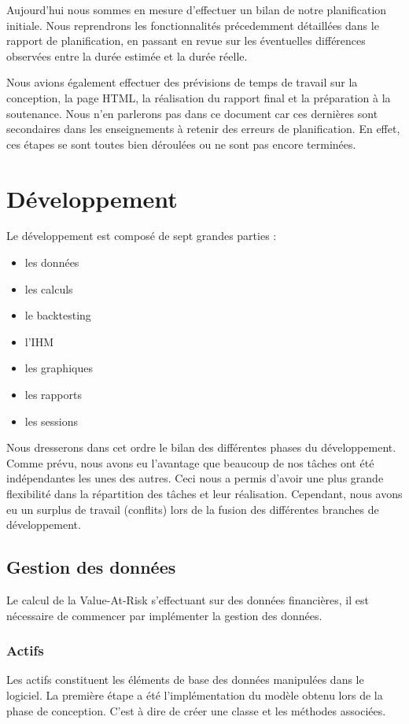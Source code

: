\documentclass[a4paper]{report}
\begin{document}
Aujourd'hui nous sommes en mesure d'effectuer un bilan de notre planification initiale.
Nous reprendrons les fonctionnalités précedemment détaillées dans le rapport de planification, en passant en revue sur les éventuelles différences observées entre la durée estimée et la durée réelle.

Nous avions également effectuer des prévisions de temps de travail sur la conception, la page HTML, la réalisation du rapport final et la préparation à la soutenance.
Nous n'en parlerons pas dans ce document car ces dernières sont secondaires dans les enseignements à retenir des erreurs de planification.
En effet, ces étapes se sont toutes bien déroulées ou ne sont pas encore terminées.


\chapter{Développement}
Le développement est composé de sept grandes parties :
\begin{itemize}
  \item les données
  \item les calculs
  \item le backtesting
  \item l'IHM
  \item les graphiques
  \item les rapports
  \item les sessions
\end{itemize}

Nous dresserons dans cet ordre le bilan des différentes phases du développement.
Comme prévu, nous avons eu l'avantage que beaucoup de nos tâches ont été indépendantes les unes des autres.
Ceci nous a permis d'avoir une plus grande flexibilité dans la répartition des tâches et leur réalisation.
Cependant, nous avons eu un surplus de travail (conflits) lors de la fusion des différentes branches de développement.

\section{Gestion des données}
Le calcul de la Value-At-Risk s'effectuant sur des données financières, il est nécessaire de commencer par implémenter la gestion des données.

\subsection{Actifs}
Les actifs constituent les éléments de base des données manipulées dans le logiciel.
La première étape a été l'implémentation du modèle obtenu lors de la phase de conception.
C'est à dire de créer une classe et les méthodes associées.
\end{document}
